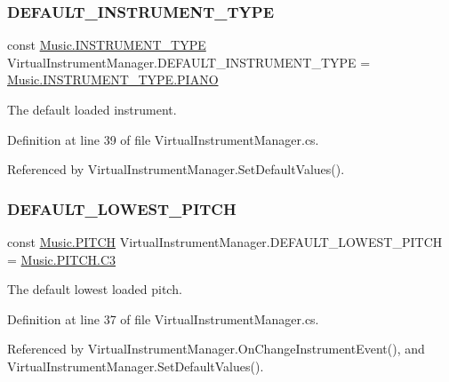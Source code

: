 \subsubsection{\texorpdfstring{D\+E\+F\+A\+U\+L\+T\+\_\+\+I\+N\+S\+T\+R\+U\+M\+E\+N\+T\+\_\+\+T\+Y\+PE}{DEFAULT\_INSTRUMENT\_TYPE}}
{\footnotesize\ttfamily const \hyperlink{group___music_enums_gabfce60192305965558a36e368ebd67c3}{Music.\+I\+N\+S\+T\+R\+U\+M\+E\+N\+T\+\_\+\+T\+Y\+PE} Virtual\+Instrument\+Manager.\+D\+E\+F\+A\+U\+L\+T\+\_\+\+I\+N\+S\+T\+R\+U\+M\+E\+N\+T\+\_\+\+T\+Y\+PE = \hyperlink{group___music_enums_ggabfce60192305965558a36e368ebd67c3aef6dcf375679288e8fe520ec07f29130}{Music.\+I\+N\+S\+T\+R\+U\+M\+E\+N\+T\+\_\+\+T\+Y\+P\+E.\+P\+I\+A\+NO}\hspace{0.3cm}{\ttfamily [private]}}



The default loaded instrument. 



Definition at line 39 of file Virtual\+Instrument\+Manager.\+cs.



Referenced by Virtual\+Instrument\+Manager.\+Set\+Default\+Values().

\mbox{\label{group___v_i_m_const_ga0ae09555ae6bc8a04110599510a0d77d}} 
\subsubsection{\texorpdfstring{D\+E\+F\+A\+U\+L\+T\+\_\+\+L\+O\+W\+E\+S\+T\+\_\+\+P\+I\+T\+CH}{DEFAULT\_LOWEST\_PITCH}}
{\footnotesize\ttfamily const \hyperlink{group___music_enums_ga508f69b199ea518f935486c990edac1d}{Music.\+P\+I\+T\+CH} Virtual\+Instrument\+Manager.\+D\+E\+F\+A\+U\+L\+T\+\_\+\+L\+O\+W\+E\+S\+T\+\_\+\+P\+I\+T\+CH = \hyperlink{group___music_enums_gga508f69b199ea518f935486c990edac1da3abe124ecc82bf2c2e22e6058f38c50c}{Music.\+P\+I\+T\+C\+H.\+C3}\hspace{0.3cm}{\ttfamily [private]}}



The default lowest loaded pitch. 



Definition at line 37 of file Virtual\+Instrument\+Manager.\+cs.



Referenced by Virtual\+Instrument\+Manager.\+On\+Change\+Instrument\+Event(), and Virtual\+Instrument\+Manager.\+Set\+Default\+Values().

